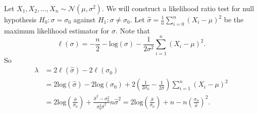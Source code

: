 Let $X_1, X_2, ..., X_n \sim \mathcal{N}(\mu, \sigma^2)$.
We will construct a likelihood ratio test for null hypothesis $H_0: \sigma = \sigma_0$ against $H_1: \sigma \neq \sigma_0$.
Let $\hat{\sigma} = \frac{1}{n}\sum_{i=0}^n (X_i - \mu)^2$ be the maximum likelihood estimator for $\sigma$.
Note that
$$
\ell(\sigma) = -\frac{n}{2} - \mathrm{log}(\sigma) - \frac{1}{2\sigma^2} \sum_{i=1}^n (X_i - \mu)^2.
$$
So
\begin{equation*}
\begin{split}
\lambda &= 2\ell(\hat{\sigma}) - 2\ell(\sigma_0) \\
    &= 2\mathrm{log}(\hat{\sigma}) - 2\mathrm{log}(\sigma_0) + 2\left(\frac{1}{2\sigma_0} - \frac{1}{2\hat{\sigma}}\right) \sum_{i=1}^n (X_i - \mu)^2 \\
    &= 2\mathrm{log}\left(\frac{\hat{\sigma}}{\sigma_0}\right) + \frac{\hat{\sigma}^2 - \sigma_0^2}{\sigma_0^2 \hat{\sigma}^2} n \hat{\sigma}^2
    = 2\mathrm{log}\left(\frac{\hat{\sigma}}{\sigma_0}\right) + n - n\left(\frac{\sigma_0}{\hat{\sigma}}\right)^2.
\end{split}
\end{equation*}
